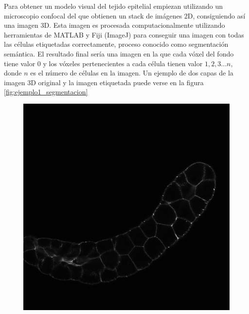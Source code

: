 Para obtener un modelo visual del tejido epitelial empiezan utilizando un microscopio confocal del que obtienen un stack de imágenes 2D, consiguiendo así una imagen 3D. Esta imagen es procesada computacionalmente utilizando herramientas de MATLAB y Fiji (ImageJ) para conseguir una imagen con todas las células etiquetadas correctamente, proceso conocido como segmentación semántica. El resultado final sería una imagen en la que cada vóxel del fondo tiene valor 0 y los vóxeles pertenecientes a cada célula tienen valor $1,2,3...n$, donde $n$ es el número de células en la imagen. Un ejemplo de dos capas de la imagen 3D original y la imagen etiquetada puede verse en la figura \ref{fig:ejemplo1_segmentacion}

\begin{figure}[ht]
\centering
\includegraphics[scale=0.18]{img/raw 04_1a Z=77.png}
\vspace*{1mm}

\end{figure}
